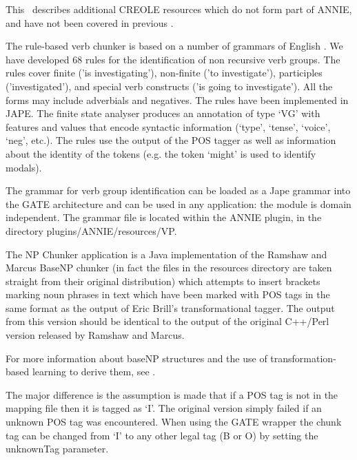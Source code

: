This \chapthing\ describes additional CREOLE resources which do not form part of
ANNIE, and have not been covered in previous \chapthings.


The rule-based verb chunker is based on a number of grammars of English
\cite{collins:cobuild:99,azar:89}. We have developed 68 rules for the
identification of non recursive verb groups.  The rules cover finite
('is investigating'), non-finite ('to investigate'), participles
('investigated'), and special verb constructs ('is going to
investigate'). All the forms may include adverbials and negatives. The
rules have been implemented in JAPE. The finite state analyser
produces an annotation of type `VG' with features and values that
encode syntactic information (`type', `tense', `voice', `neg',
etc.). The rules use the output
of the POS tagger as well as information about the identity of the
tokens (e.g. the token `might' is used to identify modals).

The grammar for verb group identification can be loaded as a Jape
grammar into the GATE architecture and can be used in any application:
the module is domain independent. The grammar file is located within 
the ANNIE plugin, in the directory plugins/ANNIE/resources/VP. 


The NP Chunker application is a Java implementation of the Ramshaw and Marcus
BaseNP chunker (in fact the files in the resources directory are taken straight
from their original distribution) which attempts to insert brackets marking noun
phrases in text which have been marked with POS tags in the same format as the
output of Eric Brill's transformational tagger. The output from this version
should be identical to the output of the original C++/Perl version released by
Ramshaw and Marcus.

For more information about baseNP structures and the use of
transformation-based learning to derive them, see \cite{Ramshaw95}.


The major difference is the assumption is made that if a POS tag
is not in the mapping file then it is tagged as `I'. The original
version simply failed if an unknown POS tag was encountered.
When using the GATE wrapper the chunk tag can be changed from `I'
to any other legal tag (B or O) by setting the unknownTag parameter.

